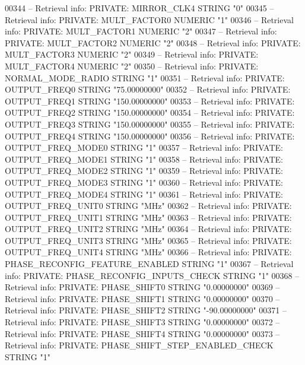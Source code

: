 \begin{DoxyCode}
{00344 \textcolor{keyword}{-- Retrieval info: PRIVATE: MIRROR\_CLK4 STRING "0"}
00345 \textcolor{keyword}{-- Retrieval info: PRIVATE: MULT\_FACTOR0 NUMERIC "1"}
00346 \textcolor{keyword}{-- Retrieval info: PRIVATE: MULT\_FACTOR1 NUMERIC "2"}
00347 \textcolor{keyword}{-- Retrieval info: PRIVATE: MULT\_FACTOR2 NUMERIC "2"}
00348 \textcolor{keyword}{-- Retrieval info: PRIVATE: MULT\_FACTOR3 NUMERIC "2"}
00349 \textcolor{keyword}{-- Retrieval info: PRIVATE: MULT\_FACTOR4 NUMERIC "2"}
00350 \textcolor{keyword}{-- Retrieval info: PRIVATE: NORMAL\_MODE\_RADIO STRING "1"}
00351 \textcolor{keyword}{-- Retrieval info: PRIVATE: OUTPUT\_FREQ0 STRING "75.00000000"}
00352 \textcolor{keyword}{-- Retrieval info: PRIVATE: OUTPUT\_FREQ1 STRING "150.00000000"}
00353 \textcolor{keyword}{-- Retrieval info: PRIVATE: OUTPUT\_FREQ2 STRING "150.00000000"}
00354 \textcolor{keyword}{-- Retrieval info: PRIVATE: OUTPUT\_FREQ3 STRING "150.00000000"}
00355 \textcolor{keyword}{-- Retrieval info: PRIVATE: OUTPUT\_FREQ4 STRING "150.00000000"}
00356 \textcolor{keyword}{-- Retrieval info: PRIVATE: OUTPUT\_FREQ\_MODE0 STRING "1"}
00357 \textcolor{keyword}{-- Retrieval info: PRIVATE: OUTPUT\_FREQ\_MODE1 STRING "1"}
00358 \textcolor{keyword}{-- Retrieval info: PRIVATE: OUTPUT\_FREQ\_MODE2 STRING "1"}
00359 \textcolor{keyword}{-- Retrieval info: PRIVATE: OUTPUT\_FREQ\_MODE3 STRING "1"}
00360 \textcolor{keyword}{-- Retrieval info: PRIVATE: OUTPUT\_FREQ\_MODE4 STRING "1"}
00361 \textcolor{keyword}{-- Retrieval info: PRIVATE: OUTPUT\_FREQ\_UNIT0 STRING "MHz"}
00362 \textcolor{keyword}{-- Retrieval info: PRIVATE: OUTPUT\_FREQ\_UNIT1 STRING "MHz"}
00363 \textcolor{keyword}{-- Retrieval info: PRIVATE: OUTPUT\_FREQ\_UNIT2 STRING "MHz"}
00364 \textcolor{keyword}{-- Retrieval info: PRIVATE: OUTPUT\_FREQ\_UNIT3 STRING "MHz"}
00365 \textcolor{keyword}{-- Retrieval info: PRIVATE: OUTPUT\_FREQ\_UNIT4 STRING "MHz"}
00366 \textcolor{keyword}{-- Retrieval info: PRIVATE: PHASE\_RECONFIG\_FEATURE\_ENABLED STRING "1"}
00367 \textcolor{keyword}{-- Retrieval info: PRIVATE: PHASE\_RECONFIG\_INPUTS\_CHECK STRING "1"}
00368 \textcolor{keyword}{-- Retrieval info: PRIVATE: PHASE\_SHIFT0 STRING "0.00000000"}
00369 \textcolor{keyword}{-- Retrieval info: PRIVATE: PHASE\_SHIFT1 STRING "0.00000000"}
00370 \textcolor{keyword}{-- Retrieval info: PRIVATE: PHASE\_SHIFT2 STRING "-90.00000000"}
00371 \textcolor{keyword}{-- Retrieval info: PRIVATE: PHASE\_SHIFT3 STRING "0.00000000"}
00372 \textcolor{keyword}{-- Retrieval info: PRIVATE: PHASE\_SHIFT4 STRING "0.00000000"}
00373 \textcolor{keyword}{-- Retrieval info: PRIVATE: PHASE\_SHIFT\_STEP\_ENABLED\_CHECK STRING "1"}
}
\end{DoxyCode}
